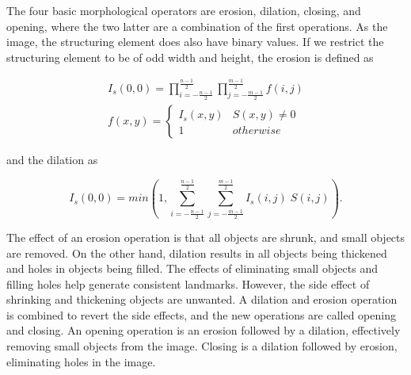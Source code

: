 

The four basic morphological operators are erosion, dilation, closing, and opening, where the two latter are a combination of the first operations. As the image, the structuring element does also have binary values. If we restrict the structuring element to be of odd width and height, the erosion is defined as 

\begin{equation}
    \begin{split}
        I_s(0,0) = \prod_{i = -\frac{n-1}{2}}^\frac{n-1}{2} \prod_{j = -\frac{m-1}{2}}^\frac{m-1}{2} f(i,j) \\
        f(x,y) = 
        \begin{cases}
        I_s(x,y) & S(x,y) \neq 0 \\
        1 & otherwise
        \end{cases}
    \end{split}
    \label{eq:erosion}
\end{equation}

and the dilation as

\begin{equation}
    I_s(0,0) = min(1, \sum_{i = -\frac{n-1}{2}}^\frac{n-1}{2} \sum_{j = -\frac{m-1}{2}}^\frac{m-1}{2} I_s(i,j) \; S(i,j)).
    \label{eq:dialation}
\end{equation}

The effect of an erosion operation is that all objects are shrunk, and small objects are removed. On the other hand, dilation results in all objects being thickened and holes in objects being filled. The effects of eliminating small objects and filling holes help generate consistent landmarks. However, the side effect of shrinking and thickening objects are unwanted. A dilation and erosion operation is combined to revert the side effects, and the new operations are called opening and closing. An opening operation is an erosion followed by a dilation, effectively removing small objects from the image. Closing is a dilation followed by erosion, eliminating holes in the image. 
